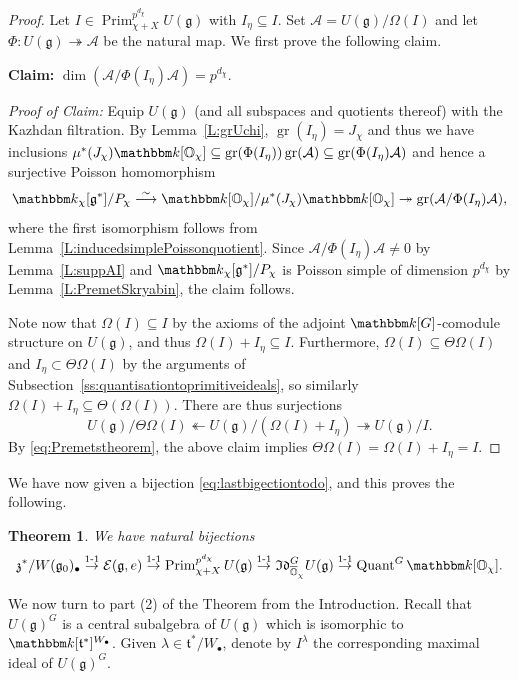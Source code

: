 \documentclass[twoside,12pt,reqno]{amsart}
\newtheorem{Theorem}{Theorem}[section]
\theoremstyle{remark}
\numberwithin{equation}{section}
\def\isoto{\overset{\sim}{\longrightarrow}}
\def\k{{\mathbbm k}}
\def\gr{\operatorname{gr}}
\def\Quant{\operatorname{Quant}}
\def\Prim{\operatorname{Prim}}
\def\o{\overline}
\def\O{{\mathbb O}}
\def\g{{\mathfrak g}}
\def\t{\mathfrak t}
\def\z{\mathfrak{z}}
\def\Idl{\mathfrak{Id}}
\def\cA{\mathcal{A}}
\def\E{\mathcal{E}}
\begin{document}
\begin{proof}
    Let $I\in\Prim_{\chi+X}^{p^{d_\chi}} U(\g)$ with $I_\eta\subseteq I$. Set $\cA=U(\g)/\Omega(I)$ and let $\Phi:U(\g)\twoheadrightarrow \cA$ be the natural map. We first prove the following claim.
    
    {\bf Claim:} $\dim(\cA/\Phi(I_\eta)\cA)={p^{d_\chi}}$.

    {\em Proof of Claim:} Equip $U(\g)$ (and all subspaces and quotients thereof) with the Kazhdan filtration. By Lemma~\ref{L:grUchi}, $\gr(I_\eta)=J_\chi$ and thus we have inclusions $\mu^*(J_\chi)\k[\O_\chi]\subseteq \gr(\Phi(I_\eta))\gr(\cA)\subseteq \gr(\Phi(I_\eta)\cA)$ and hence a surjective Poisson homomorphism $$\k_\chi[\g^*]/P_\chi\isoto \k[\O_\chi]/\mu^*(J_\chi)\k[\O_\chi]\twoheadrightarrow \gr(\cA/\Phi(I_\eta)\cA),$$ where the first isomorphism follows from Lemma~\ref{L:inducedsimplePoissonquotient}. Since $\cA/\Phi(I_\eta)\cA\neq 0$ by Lemma~\ref{L:suppAI} and $\k_\chi[\g^*]/P_\chi$ is Poisson simple of dimension ${p^{d_\chi}}$ by Lemma~\ref{L:PremetSkryabin}, the claim follows.

    Note now that $\Omega(I)\subseteq I$ by the axioms of the adjoint $\k[G]$-comodule structure on $U(\g)$, and thus $\Omega(I)+I_\eta\subseteq I$. Furthermore, $\Omega(I)\subseteq \Theta\Omega(I)$ and $I_\eta \subset \Theta\Omega(I)$ by the arguments of Subsection~\ref{ss:quantisationtoprimitiveideals}, so similarly $\Omega(I)+I_\eta\subseteq \Theta(\Omega(I))$. There are thus surjections $$U(\g)/\Theta\Omega(I) \twoheadleftarrow U(\g)/(\Omega(I)+ I_\eta) \twoheadrightarrow U(\g)/I.$$ By \eqref{eq:Premetstheorem}, the above claim implies $\Theta\Omega(I)=\Omega(I)+ I_\eta=I$.
\end{proof}

We have now given a bijection \eqref{eq:lastbigectiontodo}, and this proves the following.
\begin{Theorem}\label{T:MainThm}
    We have natural bijections
    \begin{eqnarray}
        \label{eq:allthebijections}
         \z^*/W(\g_0)_\bullet \overset{1\text{-}1}{\to}\E(\g,e)\overset{1\text{-}1}{\to} \Prim_{\chi+X}^{{p^{d_\chi}}} U(\g)\overset{1\text{-}1}{\to} \Idl_{\o\O_\chi}^G U(\g)\overset{1\text{-}1}{\to} \Quant^G \k[\O_\chi].
    \end{eqnarray}
\end{Theorem}

We now turn to part (2) of the Theorem from the Introduction. Recall that $U(\g)^G$ is a central subalgebra of $U(\g)$ which is isomorphic to $\k[\t^*]^{W_\bullet}$. Given $\lambda\in\t^*/W_\bullet$, denote by $I^\lambda$ the corresponding maximal ideal of $U(\g)^G$.
\end{document}
